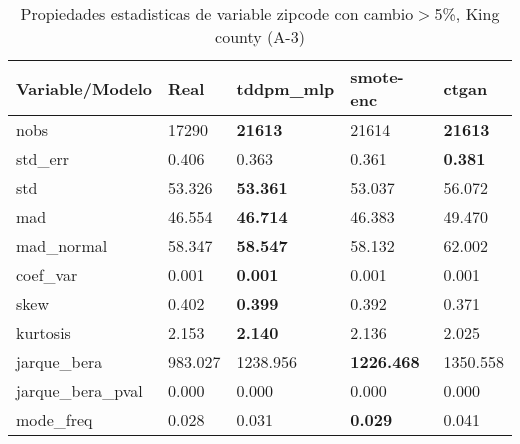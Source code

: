 \begin{table}[H]
\centering
\fontsize{8}{14}\selectfont
\caption{Propiedades estadisticas de variable zipcode con cambio\ensuremath{>}5\%, King county (A-3)}
\label{table-stats-king county-a-3-zipcode-short}
\begin{tabular}{|l|m{10em}|m{10em}|m{10em}|m{10em}|}
\hline
 \rowcolor[gray]{0.8}
Variable/Modelo & Real & tddpm\_mlp & smote-enc & ctgan \\
\hline nobs & 17290 & \bfseries 21613 & \cellcolor[rgb]{0.9, 0.54, 0.52} 21614 & \bfseries 21613 \\
\hline std\_err & 0.406 & 0.363 & \cellcolor[rgb]{0.9, 0.54, 0.52} 0.361 & \bfseries 0.381 \\
\hline std & 53.326 & \bfseries 53.361 & 53.037 & \cellcolor[rgb]{0.9, 0.54, 0.52} 56.072 \\
\hline mad & 46.554 & \bfseries 46.714 & 46.383 & \cellcolor[rgb]{0.9, 0.54, 0.52} 49.470 \\
\hline mad\_normal & 58.347 & \bfseries 58.547 & 58.132 & \cellcolor[rgb]{0.9, 0.54, 0.52} 62.002 \\
\hline coef\_var & 0.001 & \bfseries 0.001 & 0.001 & \cellcolor[rgb]{0.9, 0.54, 0.52} 0.001 \\
\hline skew & 0.402 & \bfseries 0.399 & 0.392 & \cellcolor[rgb]{0.9, 0.54, 0.52} 0.371 \\
\hline kurtosis & 2.153 & \bfseries 2.140 & 2.136 & \cellcolor[rgb]{0.9, 0.54, 0.52} 2.025 \\
\hline jarque\_bera & 983.027 & 1238.956 & \bfseries 1226.468 & \cellcolor[rgb]{0.9, 0.54, 0.52} 1350.558 \\
\hline jarque\_bera\_pval & 0.000 & 0.000 & 0.000 & 0.000 \\
\hline mode\_freq & 0.028 & 0.031 & \bfseries 0.029 & \cellcolor[rgb]{0.9, 0.54, 0.52} 0.041 \\
\hline
\end{tabular}
\end{table}
